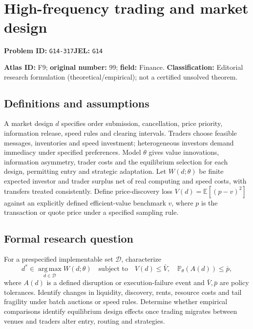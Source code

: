 \documentclass[11pt,a4paper]{article}
\begin{document}
\section*{High-frequency trading and market design}
\textbf{Problem ID:} \texttt{G14-317}\quad \textbf{JEL:} \texttt{G14}\par
\label{problem:OP-0099}
\label{atlas:prob:F9}

\noindent\textbf{Atlas ID:} F9; \textbf{original number:} 99; \textbf{field:} Finance. \textbf{Classification:} Editorial research formulation (theoretical/empirical); not a certified unsolved theorem.

\subsection*{Definitions and assumptions}
A market design $d$ specifies order submission, cancellation, price priority, information release, speed rules and clearing intervals. Traders choose feasible messages, inventories and speed investment; heterogeneous investors demand immediacy under specified preferences. Model $\theta$ gives value innovations, information asymmetry, trader costs and the equilibrium selection for each design, permitting entry and strategic adaptation. Let $W(d;\theta)$ be finite expected investor and trader surplus net of real computing and speed costs, with transfers treated consistently. Define price-discovery loss $V(d)=\mathbb E[(p-v)^2]$ against an explicitly defined efficient-value benchmark $v$, where $p$ is the transaction or quote price under a specified sampling rule.

\subsection*{Formal research question}
For a prespecified implementable set $\mathcal D$, characterize
\[
 d^*\in\operatorname*{arg\,max}_{d\in\mathcal D}W(d;\theta)
 \quad\text{subject to}\quad
 V(d)\le\bar V,\quad\mathbb P_\theta(A(d))\le\bar p,
\]
where $A(d)$ is a defined disruption or execution-failure event and $\bar V,\bar p$ are policy tolerances. Identify changes in liquidity, discovery, rents, resource costs and tail fragility under batch auctions or speed rules. Determine whether empirical comparisons identify equilibrium design effects once trading migrates between venues and traders alter entry, routing and strategies.
\end{document}
